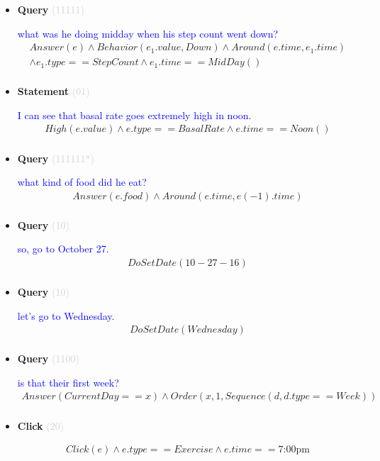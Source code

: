 \documentclass[11pt]{article}
\newcommand{\key}[1]{\textcolor{lightgray}{#1}}
\newcounter{CQuery}
\newcounter{CStatement}
\newcounter{CClick}
\begin{document}
\begin{itemize}
\item
\textbf{Query\theCQuery} \key{(11111)} \addtocounter{CQuery}{1}
\textcolor{blue}{ what was he doing midday when his step count went down? }
\begin{multline*}
Answer(e) \wedge Behavior(e_1.value, Down) \wedge Around(e.time, e_1.time) \\ 
\wedge e_1.type==StepCount \wedge e_1.time==MidDay() \\ 
\end{multline*}


\item
\textbf{Statement\theCStatement} \key{(01)} \addtocounter{CStatement}{1}
\textcolor{blue}{ I can see that basal rate goes extremely high in noon. }
\begin{multline*}
High(e.value) \wedge e.type==BasalRate \wedge e.time==Noon() \\ 
\end{multline*}


\item
\textbf{Query\theCQuery} \key{(111111*)} \addtocounter{CQuery}{1}
\textcolor{blue}{ what kind of food did he eat? }
\begin{multline*}
Answer(e.food) \wedge Around(e.time, e(-1).time) \\ 
\end{multline*}


\item
\textbf{Query\theCQuery} \key{(10)} \addtocounter{CQuery}{1}
\textcolor{blue}{ so, go to October 27. }
\begin{multline*}
DoSetDate(10-27-16) \\ 
\end{multline*}


\item
\textbf{Query\theCQuery} \key{(10)} \addtocounter{CQuery}{1}
\textcolor{blue}{ let's go to Wednesday. }
\begin{multline*}
DoSetDate(Wednesday) \\ 
\end{multline*}


\item
\textbf{Query\theCQuery} \key{(1100)} \addtocounter{CQuery}{1}
\textcolor{blue}{ is that their first week? }
\begin{multline*}
Answer(CurrentDay==x) \wedge Order(x, 1, Sequence(d, d.type==Week)) \\ 
\end{multline*}


\item
\textbf{Click\theCClick} \key{(20)} \addtocounter{CClick}{1}
\textcolor{blue}{  }
\begin{multline*}
Click(e) \wedge e.type==Exercise \wedge e.time==\mbox{7:00pm} \\ 
\end{multline*}



\end{itemize}
\end{document}
